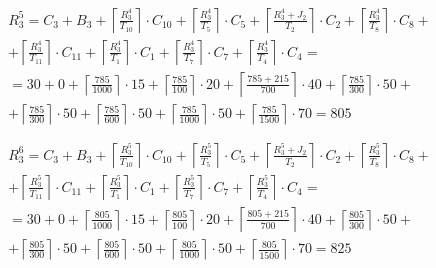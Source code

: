 \begin{gather*}
  \begin{multlined}
    R_3^5 = C_3 + B_3 + \left\lceil\frac{R_3^4}{T_{10}}\right\rceil\cdot C_{10} + %
    \left\lceil\frac{R_3^4}{T_5}\right\rceil\cdot C_5 + %
    \left\lceil\frac{R_3^4 + J_2}{T_2}\right\rceil\cdot C_2 + %
    \left\lceil\frac{R_3^4}{T_8}\right\rceil\cdot C_8 + \\%
    + \left\lceil\frac{R_3^4}{T_{11}}\right\rceil\cdot C_{11} + %
    \left\lceil\frac{R_3^4}{T_1}\right\rceil\cdot C_1 +%
    \left\lceil\frac{R_3^4}{T_7}\right\rceil\cdot C_7 +%
    \left\lceil\frac{R_3^4}{T_4}\right\rceil\cdot C_4 = \\%
    = 30 + 0 + \left\lceil\frac{785}{1000}\right\rceil\cdot 15 + %
    \left\lceil\frac{785}{100}\right\rceil\cdot 20 + %
    \left\lceil\frac{785 + 215}{700}\right\rceil\cdot 40 + %
    \left\lceil\frac{785}{300}\right\rceil\cdot 50 + \\%
    + \left\lceil\frac{785}{300}\right\rceil\cdot 50 + %
    \left\lceil\frac{785}{600}\right\rceil\cdot 50 + %
    \left\lceil\frac{785}{1000}\right\rceil\cdot 50 +%
    \left\lceil\frac{785}{1500}\right\rceil\cdot 70 = 805 \\
  \end{multlined} \\
  \begin{multlined}
    R_3^6 = C_3 + B_3 + \left\lceil\frac{R_3^5}{T_{10}}\right\rceil\cdot C_{10} + %
    \left\lceil\frac{R_3^5}{T_5}\right\rceil\cdot C_5 + %
    \left\lceil\frac{R_3^5 + J_2}{T_2}\right\rceil\cdot C_2 + %
    \left\lceil\frac{R_3^5}{T_8}\right\rceil\cdot C_8 + \\%
    + \left\lceil\frac{R_3^5}{T_{11}}\right\rceil\cdot C_{11} + %
    \left\lceil\frac{R_3^5}{T_1}\right\rceil\cdot C_1 +%
    \left\lceil\frac{R_3^5}{T_7}\right\rceil\cdot C_7 +%
    \left\lceil\frac{R_3^5}{T_4}\right\rceil\cdot C_4 = \\%
    = 30 + 0 + \left\lceil\frac{805}{1000}\right\rceil\cdot 15 + %
    \left\lceil\frac{805}{100}\right\rceil\cdot 20 + %
    \left\lceil\frac{805 + 215}{700}\right\rceil\cdot 40 + %
    \left\lceil\frac{805}{300}\right\rceil\cdot 50 + \\%
    + \left\lceil\frac{805}{300}\right\rceil\cdot 50 + %
    \left\lceil\frac{805}{600}\right\rceil\cdot 50 + %
    \left\lceil\frac{805}{1000}\right\rceil\cdot 50 +%
    \left\lceil\frac{805}{1500}\right\rceil\cdot 70 = 825 \\
  \end{multlined} \\

\end{gather*}
